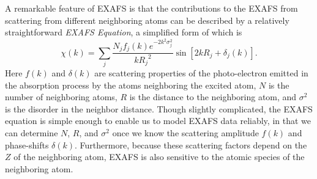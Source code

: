 A remarkable feature of EXAFS is that the contributions to the EXAFS from
scattering from different neighboring atoms can be described by a
relatively straightforward \emph{EXAFS Equation}, a simplified form of
which is
\begin{equation}
  \chi(k) = \sum_j {   \frac{N_j f_j(k) e^{-2k^2\sigma_j^2}}  {k{R_j}^2}
      \sin[2kR_j + \delta_j(k) ]}.
  \label{Eq:ABS:EXAFSEq}
\end{equation}
\noindent
Here $f(k)$ and $\delta(k)$ are scattering properties of the photo-electron
emitted in the absorption process by the atoms neighboring the excited
atom, $N$ is the number of neighboring atoms, $R$ is the distance to the
neighboring atom, and $\sigma^2$ is the disorder in the neighbor distance.
Though slightly complicated, the EXAFS equation is simple enough to enable
us to model EXAFS data reliably, in that we can determine $N$, $R$, and
$\sigma^2$ once we know the scattering amplitude $f(k)$ and phase-shifts
$\delta(k)$.  Furthermore, because these scattering factors depend on the
$Z$ of the neighboring atom, EXAFS is also sensitive to the atomic species
of the neighboring atom.
